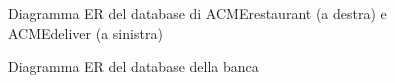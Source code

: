 \documentclass[11pt]{article} %
\begin{document}
\begin{figure}[H]
\begin{center}
\begin{subfigure}[b]{0.49\textwidth}
\end{subfigure}
\caption{Diagramma ER del database di ACMErestaurant (a destra) e ACMEdeliver (a sinistra)}
\label{db:restaurant}
\label{db:deliver}
\end{center}
\end{figure}

\begin{figure}[H]
\begin{center}
\caption{Diagramma ER del database della banca}
\label{db:bank}
\end{center}
\end{figure}
\end{document}
